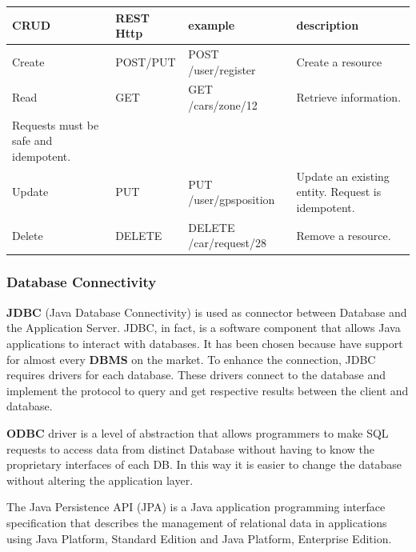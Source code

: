 \begin{center}
	\begin{adjustbox}{max width=\textwidth}	
		\begin{tabular}{|l|>{\raggedright}p{2.5cm}|>{\raggedright}p{4.5cm}|>{\raggedright}p{5cm}|}
			\hline 
			CRUD & REST Http & example &description\tabularnewline
			\hline 
			Create & POST/PUT & POST /user/register  & Create a resource \tabularnewline
			\hline 
			Read & GET & GET /cars/zone/12 & Retrieve information. \\  Requests must be safe and idempotent.\tabularnewline
			\hline 
			Update & PUT & PUT /user/gpsposition & Update an existing entity. Request is idempotent. \tabularnewline
			\hline 
			Delete & DELETE & DELETE /car/request/28 & Remove a resource.\tabularnewline
			\hline 
		\end{tabular}
	\end{adjustbox}	
	\par\end{center}

\subsubsection{Database Connectivity} \textbf{JDBC} (Java Database Connectivity) is used as connector between Database and the Application Server. JDBC, in fact, is a software component that allows Java applications to interact with databases. It has been chosen because have support for almost every \textbf{DBMS} on the market.
To enhance the connection, JDBC requires drivers for each database. These drivers connect to the database and implement the protocol to query and get respective results between the client and database. 


\textbf{ODBC} driver is a level of abstraction that allows programmers to make SQL requests to access data from distinct Database without having to know the proprietary interfaces of each DB. In this way it is easier to change the database without altering the application layer.


The Java Persistence API (JPA) is a Java application programming interface specification that describes the management of relational data in applications using Java Platform, Standard Edition and Java Platform, Enterprise Edition.

